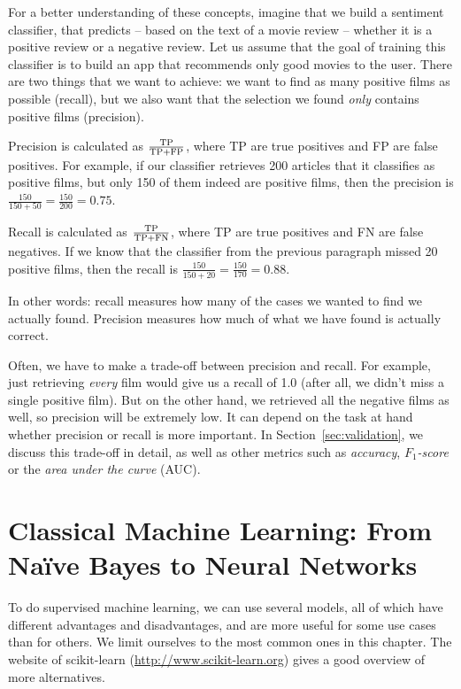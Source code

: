 For a better understanding of these concepts, imagine that we build a sentiment classifier, that predicts -- based on the
text of a movie review -- whether it is a positive review or a
negative review. Let us assume that the goal of training this classifier is to build an app that recommends only good movies to the user. There are two things
that we want to achieve: we want to find as many positive films as possible (recall), but we also want that the selection we found
\emph{only} contains positive films (precision).

Precision is calculated as $\frac{\rm{TP}}{\rm{TP}+\rm{FP}}$, where TP are true
positives and FP are false positives. For example, if our classifier
retrieves 200 articles that it classifies as positive films, but only
150 of them indeed are positive films, then the precision is
$\frac{150}{150+50} = \frac{150}{200} = 0.75$.

Recall is calculated as $\frac{\rm{TP}}{\rm{TP}+\rm{FN}}$, where TP are true
positives and FN are false negatives. If we know that the classifier
from the previous paragraph missed 20 positive films, then the recall
is $\frac{150}{150+20} = \frac{150}{170}= 0.88$.

In other words: recall measures how many of the cases we wanted to
find we actually found. Precision measures how much of what we have
found is actually correct.

Often, we have to make a trade-off between precision and recall. For
example, just retrieving \emph{every} film would give us a recall of
1.0 (after all, we didn't miss a single positive film). But on the
other hand, we retrieved all the negative films as well, so precision
will be extremely low. It can depend on the task at hand whether
precision or recall is more important. In
Section~\ref{sec:validation}, we discuss this trade-off in detail, as well as other metrics such as \emph{accuracy}, \emph{$F_1$-score} or the \emph{area under the curve} (AUC).

%
\section{Classical Machine Learning: From Na\"{i}ve Bayes to Neural Networks}
\label{sec:nb2dnn}
To do supervised machine learning, we can use several models, all of
which have different advantages and disadvantages, and are more useful
for some use cases than for others.
We limit ourselves to the most common ones in this chapter. The
website of scikit-learn (\url{http://www.scikit-learn.org}) gives a
good overview of more alternatives.

